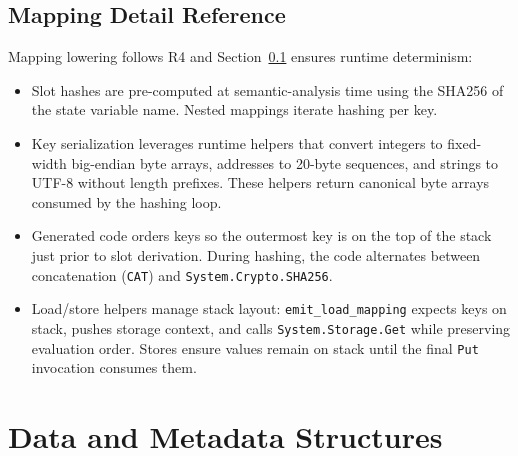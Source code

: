 \documentclass[11pt]{article}
\begin{document}
\subsection{Mapping Detail Reference}
\label{sec:mapping-detail}
Mapping lowering follows R4 and Section~\ref{sec:mapping-detail} ensures runtime determinism:
\begin{itemize}
    \item Slot hashes are pre-computed at semantic-analysis time using the SHA256 of the state variable name. Nested mappings iterate hashing per key.
    \item Key serialization leverages runtime helpers that convert integers to fixed-width big-endian byte arrays, addresses to 20-byte sequences, and strings to UTF-8 without length prefixes. These helpers return canonical byte arrays consumed by the hashing loop.
    \item Generated code orders keys so the outermost key is on the top of the stack just prior to slot derivation. During hashing, the code alternates between concatenation (\texttt{CAT}) and \texttt{System.Crypto.SHA256}.
    \item Load/store helpers manage stack layout: \texttt{emit\_load\_mapping} expects keys on stack, pushes storage context, and calls \texttt{System.Storage.Get} while preserving evaluation order. Stores ensure values remain on stack until the final \texttt{Put} invocation consumes them.
\end{itemize}

\section{Data and Metadata Structures}
\end{document}
